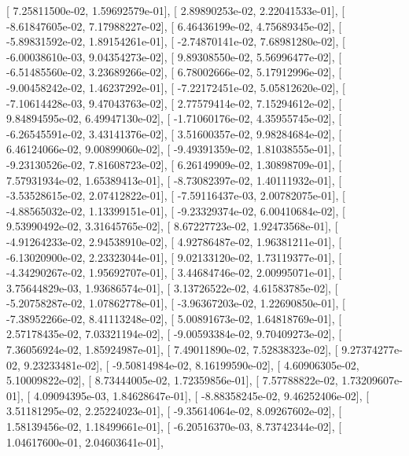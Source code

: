 \documentclass{article}
\begin{document}
       [  7.25811500e-02,   1.59692579e-01],
       [  2.89890253e-02,   2.22041533e-01],
       [ -8.61847605e-02,   7.17988227e-02],
       [  6.46436199e-02,   4.75689345e-02],
       [ -5.89831592e-02,   1.89154261e-01],
       [ -2.74870141e-02,   7.68981280e-02],
       [ -6.00038610e-03,   9.04354273e-02],
       [  9.89308550e-02,   5.56996477e-02],
       [ -6.51485560e-02,   3.23689266e-02],
       [  6.78002666e-02,   5.17912996e-02],
       [ -9.00458242e-02,   1.46237292e-01],
       [ -7.22172451e-02,   5.05812620e-02],
       [ -7.10614428e-03,   9.47043763e-02],
       [  2.77579414e-02,   7.15294612e-02],
       [  9.84894595e-02,   6.49947130e-02],
       [ -1.71060176e-02,   4.35955745e-02],
       [ -6.26545591e-02,   3.43141376e-02],
       [  3.51600357e-02,   9.98284684e-02],
       [  6.46124066e-02,   9.00899060e-02],
       [ -9.49391359e-02,   1.81038555e-01],
       [ -9.23130526e-02,   7.81608723e-02],
       [  6.26149909e-02,   1.30898709e-01],
       [  7.57931934e-02,   1.65389413e-01],
       [ -8.73082397e-02,   1.40111932e-01],
       [ -3.53528615e-02,   2.07412822e-01],
       [ -7.59116437e-03,   2.00782075e-01],
       [ -4.88565032e-02,   1.13399151e-01],
       [ -9.23329374e-02,   6.00410684e-02],
       [  9.53990492e-02,   3.31645765e-02],
       [  8.67227723e-02,   1.92473568e-01],
       [ -4.91264233e-02,   2.94538910e-02],
       [  4.92786487e-02,   1.96381211e-01],
       [ -6.13020900e-02,   2.23323044e-01],
       [  9.02133120e-02,   1.73119377e-01],
       [ -4.34290267e-02,   1.95692707e-01],
       [  3.44684746e-02,   2.00995071e-01],
       [  3.75644829e-03,   1.93686574e-01],
       [  3.13726522e-02,   4.61583785e-02],
       [ -5.20758287e-02,   1.07862778e-01],
       [ -3.96367203e-02,   1.22690850e-01],
       [ -7.38952266e-02,   8.41113248e-02],
       [  5.00891673e-02,   1.64818769e-01],
       [  2.57178435e-02,   7.03321194e-02],
       [ -9.00593384e-02,   9.70409273e-02],
       [  7.36056924e-02,   1.85924987e-01],
       [  7.49011890e-02,   7.52838323e-02],
       [  9.27374277e-02,   9.23233481e-02],
       [ -9.50814984e-02,   8.16199590e-02],
       [  4.60906305e-02,   5.10009822e-02],
       [  8.73444005e-02,   1.72359856e-01],
       [  7.57788822e-02,   1.73209607e-01],
       [  4.09094395e-03,   1.84628647e-01],
       [ -8.88358245e-02,   9.46252406e-02],
       [  3.51181295e-02,   2.25224023e-01],
       [ -9.35614064e-02,   8.09267602e-02],
       [  1.58139456e-02,   1.18499661e-01],
       [ -6.20516370e-03,   8.73742344e-02],
       [  1.04617600e-01,   2.04603641e-01],
\end{document}
